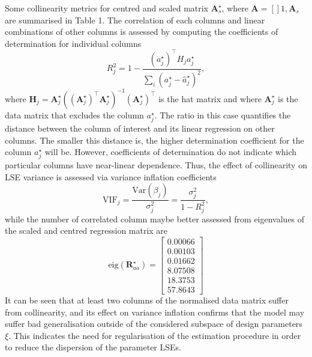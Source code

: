 \documentclass[a4paper,11pt,twoside]{article}
\theoremstyle{mytheoremstyle}
\begin{document}
Some collinearity metrics for centred and scaled matrix $\mathbf{A}_{s}^{\star}$, where $\mathbf{A} = \left[\right]1, \mathbf{A}_{s}$ are summarised in Table 1. The correlation of each columns and linear combinations of other columns is assessed by computing the coefficients of determination for individual columns
\begin{equation*}
R^{2}_{j} = 1 - \frac{(a^{\star}_{j})^{\top} H_j a^{\star}_{j}}{\sum_{i}( a^{\star}_{j} - \hat{a}^{\star}_{j})^2},
\end{equation*} 
where $ \mathbf{H}_j = \mathbf{A}_{j}^{\star}((\mathbf{A}_{j}^{\star})^{\top}\mathbf{A}_{j}^{\star})^{-1}(\mathbf{A}_{j}^{\star})^{\top}$ is the hat matrix and where $\mathbf{A}_{j}^{\star}$ is the data matrix that excludes the column $a^{\star}_{j}$. The ratio in this case quantifies the distance between the column of interest and its linear  regression on other columns. The smaller this distance is, the higher determination coefficient for the column $a^{\star}_{j}$ will be. However, coefficients of determination do not indicate which particular columns have near-linear dependence. Thus, the effect of collinearity on LSE variance is assessed via variance inflation coefficients
\begin{equation*}
\text{VIF}_j = \frac{\text{Var}(\beta_j)}{\sigma^{2}_{j}} = \frac{\sigma^{2}_{j}}{1 - R^{2}_{j}},
\end{equation*}
while the number of correlated column maybe better assessed from eigenvalues of the scaled and centred regression matrix are
\begin{equation*}
\text{eig}(\mathbf{R}^{\star}_{aa}) = \left[\begin{array}{r}
0.00066\\
0.00103\\
0.01662\\
8.07508\\
18.3753\\
57.8643
\end{array}\right]
\end{equation*}
It can be seen that at least two columns of the normalised data matrix suffer from collinearity, and its effect on variance inflation confirms that the model may suffer bad generalisation outside of the considered subspace of design parameters $\xi$. This indicates the need for regularisation of the estimation procedure in order to reduce the dispersion of the parameter LSEs.
\end{document}
